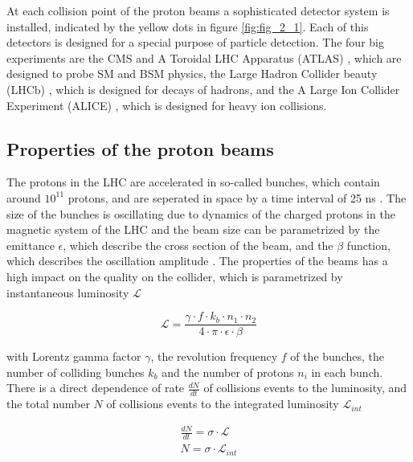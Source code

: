 At each collision point of the proton beams a sophisticated detector system is installed, indicated by the yellow dots in figure \ref{fig:fig_2_1}. Each of this detectors is designed for a special purpose of particle detection. The four big experiments are the \gls{CMS} and A Toroidal LHC Apparatus (\gls{ATLAS}) \cite{ATLAS}, which are designed to probe \gls{SM} and \gls{BSM} physics, the Large Hadron Collider beauty (\gls{LHCb}) \cite{LHCb}, which is designed for decays of hadrons, and the A Large Ion Collider Experiment (\gls{ALICE}) \cite{ALICE}, which is designed for heavy ion collisions.


\subsection{Properties of the proton beams}
\label{sec:section_2_1_1}

The protons in the \gls{LHC} are accelerated in so-called bunches, which contain around $10^{11}$ protons, and are seperated in space by a time interval of 25 ns \cite{LHCSTATS}. The size of the bunches is oscillating due to dynamics of the charged protons in the magnetic system of the \gls{LHC} \cite{LHC} and the beam size can be parametrized by the emittance $\epsilon$, which describe the cross section of the beam, and the $\beta$ function, which describes the oscillation amplitude \cite{BEAMPHY}. The properties of the beams has a high impact on the quality on the collider, which is parametrized by instantaneous luminosity $\mathcal{L}$ \cite{Luminosity}

\begin{equation}
	\label{eq:eq_2_1}
	\mathcal{L} = \frac{\gamma \cdot f \cdot k_{b} \cdot n_{1} \cdot n_{2}}{4 \cdot \pi \cdot \epsilon \cdot \beta}
\end{equation} 

with Lorentz gamma factor $\gamma$, the revolution frequency $f$ of the bunches, the number of colliding bunches $k_{b}$ and the number of protons $n_{i}$ in each bunch. There is a direct dependence of rate $\frac{dN}{dt}$ of collisions events to the luminosity, and the total number $N$ of collisions events to the integrated luminosity $\mathcal{L}_{int}$

\begin{equation}
	\label{eq:eq_2_2}
	\begin{split}
		\frac{dN}{dt} = \sigma \cdot \mathcal{L} \\
		N = \sigma \cdot \mathcal{L}_{int}
	\end{split}
\end{equation}	

